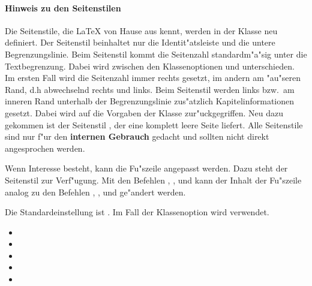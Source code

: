 \documentclass[twoside,colorback,accentcolor=tud4c,11pt]{tudreport}
\begin{document}
    \paragraph{Hinweis zu den Seitenstilen}
    Die Seitenstile, die {\LaTeX} von Hause aus kennt, werden in der  Klasse
    neu definiert. Der Seitenstil  beinhaltet nur die Identit"atsleiste und die
    untere Begrenzungslinie. Beim Seitenstil  kommt die Seitenzahl
    standardm"a"sig unter die Textbegrenzung. Dabei wird zwischen den Klassenoptionen
     und  unterschieden. Im ersten Fall wird die Seitenzahl
    immer rechts gesetzt, im andern am "au"seren Rand, d.h abwechselnd rechts und links. Beim
    Seitenstil  werden links bzw.\ am inneren Rand unterhalb der Begrenzungslinie
    zus"atzlich Kapitelinformationen gesetzt. Dabei wird auf die Vorgaben der
     Klasse zur"uckgegriffen. Neu dazu gekommen ist der Seitenstil
    , der eine komplett leere Seite liefert. Alle Seitenstile sind nur f"ur
    den \textbf{internen Gebrauch} gedacht und sollten nicht direkt angesprochen werden.
    
    Wenn Interesse besteht, kann die Fu"szeile angepasst werden. Dazu steht der Seitenstil
     zur Verf"ugung. Mit den Befehlen , , 
    und  kann der Inhalt der Fu"szeile analog zu den
    Befehlen , ,
     und  ge"andert
    werden.

    Die Standardeinstellung ist . Im Fall der Klassenoption 
    wird  verwendet.
    \begin{itemize}\itemsep-1ex
      \item {}
      \item {}
      \item {}
      \item {}
      \item{}
    \end{itemize}
    
\end{document}
